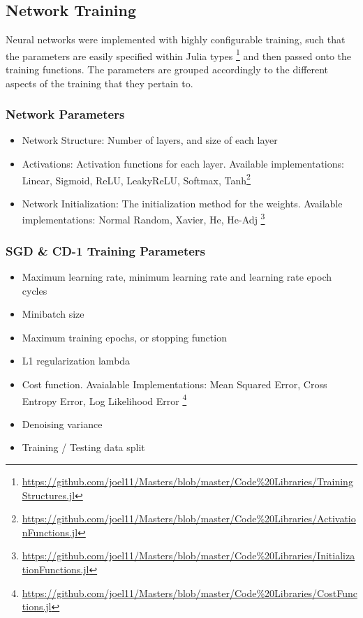 \documentclass[a4paper,11pt,oneside]{article}
\theoremstyle{plain}
\theoremstyle{definition}
\begin{document}
	\subsection{Network Training}
	
	Neural networks were implemented with highly configurable training, such that the parameters are easily specified within Julia types \footnote{\url{https://github.com/joel11/Masters/blob/master/Code\%20Libraries/TrainingStructures.jl}} and then passed onto the training functions. The parameters are grouped accordingly to the different aspects of the training that they pertain to.
	
	\subsubsection{Network Parameters}
	\begin{itemize}
		\item[1] Network Structure: Number of layers, and size of each layer
		\item[2] Activations: Activation functions for each layer. Available implementations: Linear, Sigmoid, ReLU, LeakyReLU, Softmax, Tanh\footnote{\url{https://github.com/joel11/Masters/blob/master/Code\%20Libraries/ActivationFunctions.jl}}
		\item[3] Network Initialization: The initialization method for the weights. Available implementations: Normal Random, Xavier, He, He-Adj \footnote{\url{https://github.com/joel11/Masters/blob/master/Code\%20Libraries/InitializationFunctions.jl}}
	\end{itemize}
	
	\subsubsection{SGD \& CD-1 Training Parameters}
	\begin{itemize}
		\item[1] Maximum learning rate, minimum learning rate and learning rate epoch cycles
		\item[2] Minibatch size
		\item[3] Maximum training epochs, or stopping function
		\item[4] L1 regularization lambda
		\item[5] Cost function. Avaialable Implementations: Mean Squared Error, Cross Entropy Error, Log Likelihood Error \footnote{\url{https://github.com/joel11/Masters/blob/master/Code\%20Libraries/CostFunctions.jl}}
		\item[6] Denoising variance
		\item[7] Training / Testing data split
	\end{itemize}	
	
\end{document}

